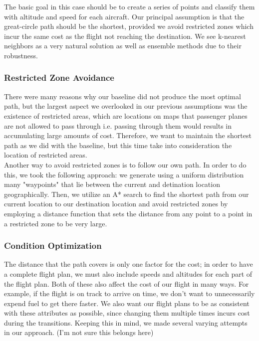 \documentclass{article}[12pt]
\begin{document}
\begin{multicols}{2}
The basic goal in this case should be to create a series of points and classify them with altitude and speed for each aircraft. Our principal assumption is that the great-circle path should be the shortest, provided we avoid restricted zones which incur the same cost as the flight not reaching the destination. We see k-nearest neighbors as a very natural solution as well as ensemble methods due to their robustness.

\subsubsection{Restricted Zone Avoidance}

There were many reasons why our baseline did not produce the most optimal path, but the largest aspect we overlooked in our previous assumptions was the existence of restricted areas, which are locations on maps that passenger planes are not allowed to pass through i.e. passing through them would results in accumulating large amounts of cost. Therefore, we want to maintain the shortest path as we did with the baseline, but this time take into consideration the location of restricted areas.\\

Another way to avoid restricted zones is to follow our own path. In order to do this, we took the following approach: we generate using a uniform distribution many "waypoints" that lie between the current and detination location geographically. Then, we utilize an A* search to find the shortest path from our current location to our destination location and avoid restricted zones by employing a distance function that sets the distance from any point to a point in a restricted zone to be very large.

\subsubsection{Condition Optimization}
The distance that the path covers is only one factor for the cost; in order to have a complete flight plan, we must also include speeds and altitudes for each part of the flight plan. Both of these also affect the cost of our flight in many ways. For example, if the flight is on track to arrive on time, we don't want to unnecessarily expend fuel to get there faster. We also want our flight plans to be as consistent with these attributes as possible, since changing them multiple times incurs cost during the transitions. Keeping this in mind, we made several varying attempts in our approach. (I'm not sure this belongs here)


\end{multicols}
\end{document}
